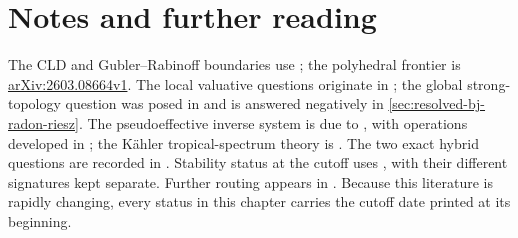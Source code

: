 \section*{Notes and further reading}

The CLD and Gubler--Rabinoff boundaries use
\cite{CLD25,GJR26,GR25PL,GR25Classical,Wanner19,BPR13Structure}; the
polyhedral frontier is
\href{https://arxiv.org/abs/2603.08664}{arXiv:2603.08664v1}.  The local valuative
questions originate in \cite{BFJ08}; the global strong-topology question was
posed in \cite[Question~11.16]{BJ22} and is answered negatively in
\cref{sec:resolved-bj-radon-riesz}.  The pseudoeffective inverse system is due
to
\cite{DXZ23}, with operations developed in \cite{Xia23Operations}; the
Kähler tropical-spectrum theory is \cite{MP24}.  The two exact hybrid questions
are recorded in \cite{PS23Hybrid}.  Stability status at the cutoff uses
\cite{Trusiani26,BJ25WeightedYTD,DarvasZhang25YTD}, with their
different signatures kept separate.  Further routing appears in
.  Because this literature is rapidly
changing, every status in this chapter carries the cutoff date printed at its
beginning.
